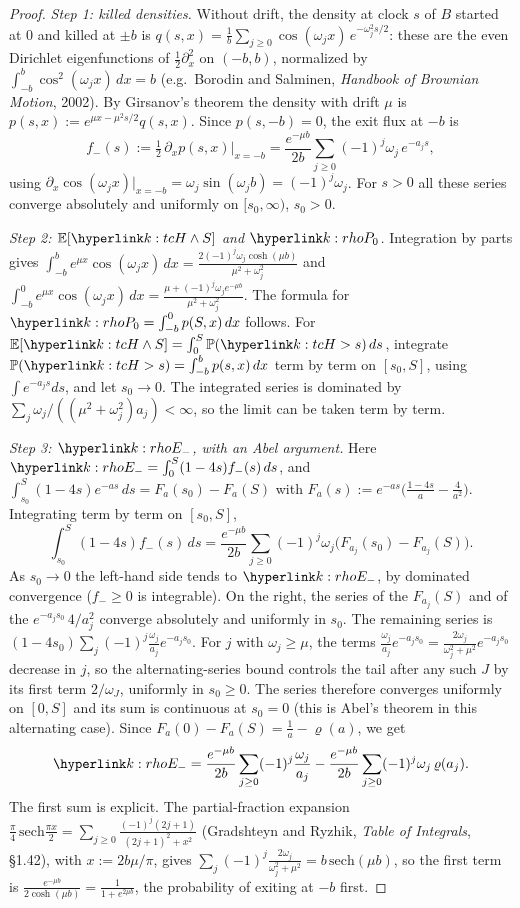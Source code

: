 \documentclass[11pt]{article}
\newcommand{\E}{\mathbb{E}}
\renewcommand{\P}{\mathbb{P}}
\newcommand{\1}{\mathbf{1}}
\begin{document}
\begin{proof}
\textit{Step 1: killed densities.} Without drift, the density at clock $s$ of $B$ started at $0$ and killed at $\pm b$ is
$q(s,x)=\frac1b\sum_{j\ge0}\cos(\omega_jx)\,e^{-\omega_j^2s/2}$: these are the even Dirichlet eigenfunctions of $\frac12\partial_x^2$ on $(-b,b)$, normalized by
$\int_{-b}^b\cos^2(\omega_jx)\,dx=b$ (e.g.\ Borodin and Salminen, \emph{Handbook of Brownian Motion}, 2002). By Girsanov's theorem the density with drift $\mu$ is
$p(s,x):=e^{\mu x-\mu^2s/2}q(s,x)$. Since $p(s,-b)=0$, the exit flux at $-b$ is
\[
f_-(s):=\tfrac12\,\partial_xp(s,x)\big|_{x=-b}=\frac{e^{-\mu b}}{2b}\sum_{j\ge0}(-1)^j\omega_j\,e^{-a_js},
\]
using $\partial_x\cos(\omega_jx)|_{x=-b}=\omega_j\sin(\omega_jb)=(-1)^j\omega_j$. For $s>0$ all these series converge absolutely and uniformly on $[s_0,\infty)$, $s_0>0$.

\textit{Step 2: $\E[\kH\wedge S]$ and $\kPo$.} Integration by parts gives $\int_{-b}^be^{\mu x}\cos(\omega_jx)\,dx=\frac{2(-1)^j\omega_j\cosh(\mu b)}{\mu^2+\omega_j^2}$ and
$\int_{-b}^0e^{\mu x}\cos(\omega_jx)\,dx=\frac{\mu+(-1)^j\omega_je^{-\mu b}}{\mu^2+\omega_j^2}$. The formula for $\kPo=\int_{-b}^0p(S,x)\,dx$ follows. For
$\E[\kH\wedge S]=\int_0^S\P(\kH>s)\,ds$, integrate $\P(\kH>s)=\int_{-b}^bp(s,x)\,dx$ term by term on $[s_0,S]$, using $\int e^{-a_js}ds$, and let $s_0\to0$. The integrated
series is dominated by $\sum_j\omega_j/((\mu^2+\omega_j^2)a_j)<\infty$, so the limit can be taken term by term.

\textit{Step 3: $\kEm$, with an Abel argument.} Here $\kEm=\int_0^S(1-4s)f_-(s)\,ds$, and $\int_{s_0}^S(1-4s)e^{-as}\,ds=F_a(s_0)-F_a(S)$ with
$F_a(s):=e^{-as}\big(\frac{1-4s}a-\frac4{a^2}\big)$. Integrating term by term on $[s_0,S]$,
\[
\int_{s_0}^S(1-4s)f_-(s)\,ds=\frac{e^{-\mu b}}{2b}\sum_{j\ge0}(-1)^j\omega_j\big(F_{a_j}(s_0)-F_{a_j}(S)\big).
\]
As $s_0\to0$ the left-hand side tends to $\kEm$, by dominated convergence ($f_-\ge0$ is integrable). On the right, the series of the $F_{a_j}(S)$ and of the
$e^{-a_js_0}\,4/a_j^2$ converge absolutely and uniformly in $s_0$. The remaining series is $(1-4s_0)\sum_j(-1)^j\frac{\omega_j}{a_j}e^{-a_js_0}$. For $j$ with
$\omega_j\ge\mu$, the terms $\frac{\omega_j}{a_j}e^{-a_js_0}=\frac{2\omega_j}{\omega_j^2+\mu^2}e^{-a_js_0}$ decrease in $j$, so the alternating-series bound controls the tail
after any such $J$ by its first term $2/\omega_J$, uniformly in $s_0\ge0$. The series therefore converges uniformly on $[0,S]$ and its sum is continuous at $s_0=0$ (this
is Abel's theorem in this alternating case). Since $F_a(0)-F_a(S)=\frac1a-\varrho(a)$, we get
\[
\kEm=\frac{e^{-\mu b}}{2b}\sum_{j\ge0}(-1)^j\frac{\omega_j}{a_j}-\frac{e^{-\mu b}}{2b}\sum_{j\ge0}(-1)^j\omega_j\,\varrho(a_j).
\]
The first sum is explicit. The partial-fraction expansion $\frac\pi4\,\mathrm{sech}\frac{\pi x}2=\sum_{j\ge0}\frac{(-1)^j(2j+1)}{(2j+1)^2+x^2}$ (Gradshteyn and Ryzhik,
\emph{Table of Integrals}, \S1.42), with $x:=2b\mu/\pi$, gives $\sum_j(-1)^j\frac{2\omega_j}{\omega_j^2+\mu^2}=b\,\mathrm{sech}(\mu b)$, so the first term is
$\frac{e^{-\mu b}}{2\cosh(\mu b)}=\frac1{1+e^{2\mu b}}$, the probability of exiting at $-b$ first.


\end{proof}
\end{document}
